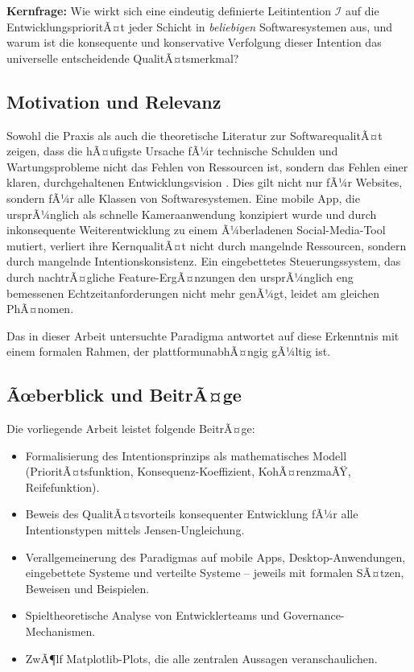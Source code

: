 ﻿\documentclass[a4paper,12pt]{article}
\theoremstyle{definition}
\begin{document}
\textbf{Kernfrage:} Wie wirkt sich eine eindeutig definierte Leitintention
$\mathcal{I}$ auf die EntwicklungsprioritÃ¤t jeder Schicht in \emph{beliebigen}
Softwaresystemen aus, und warum ist die konsequente und konservative Verfolgung
dieser Intention das universelle entscheidende QualitÃ¤tsmerkmal?

\subsection{Motivation und Relevanz}

Sowohl die Praxis als auch die theoretische Literatur zur SoftwarequalitÃ¤t
zeigen, dass die hÃ¤ufigste Ursache fÃ¼r technische Schulden und Wartungsprobleme
nicht das Fehlen von Ressourcen ist, sondern das Fehlen einer klaren,
durchgehaltenen Entwicklungsvision \cite{cunningham1992debt, fowler2018refactoring}.
Dies gilt nicht nur fÃ¼r Websites, sondern fÃ¼r alle Klassen von Softwaresystemen.
Eine mobile App, die ursprÃ¼nglich als schnelle Kameraanwendung konzipiert wurde
und durch inkonsequente Weiterentwicklung zu einem Ã¼berladenen Social-Media-Tool
mutiert, verliert ihre KernqualitÃ¤t nicht durch mangelnde Ressourcen, sondern
durch mangelnde Intentionskonsistenz. Ein eingebettetes Steuerungssystem, das
durch nachtrÃ¤gliche Feature-ErgÃ¤nzungen den ursprÃ¼nglich eng bemessenen
Echtzeitanforderungen nicht mehr genÃ¼gt, leidet am gleichen PhÃ¤nomen.

Das in dieser Arbeit untersuchte Paradigma antwortet auf diese Erkenntnis mit
einem formalen Rahmen, der plattformunabhÃ¤ngig gÃ¼ltig ist.

\subsection{Ãœberblick und BeitrÃ¤ge}

Die vorliegende Arbeit leistet folgende BeitrÃ¤ge:

\begin{itemize}
    \item Formalisierung des Intentionsprinzips als mathematisches Modell
          (PrioritÃ¤tsfunktion, Konsequenz-Koeffizient, KohÃ¤renzmaÃŸ, Reifefunktion).
    \item Beweis des QualitÃ¤tsvorteils konsequenter Entwicklung fÃ¼r alle
          Intentionstypen mittels Jensen-Ungleichung.
    \item Verallgemeinerung des Paradigmas auf mobile Apps, Desktop-Anwendungen,
          eingebettete Systeme und verteilte Systeme -- jeweils mit formalen
          SÃ¤tzen, Beweisen und Beispielen.
    \item Spieltheoretische Analyse von Entwicklerteams und Governance-Mechanismen.
    \item ZwÃ¶lf Matplotlib-Plots, die alle zentralen Aussagen veranschaulichen.
\end{itemize}
\end{document}
